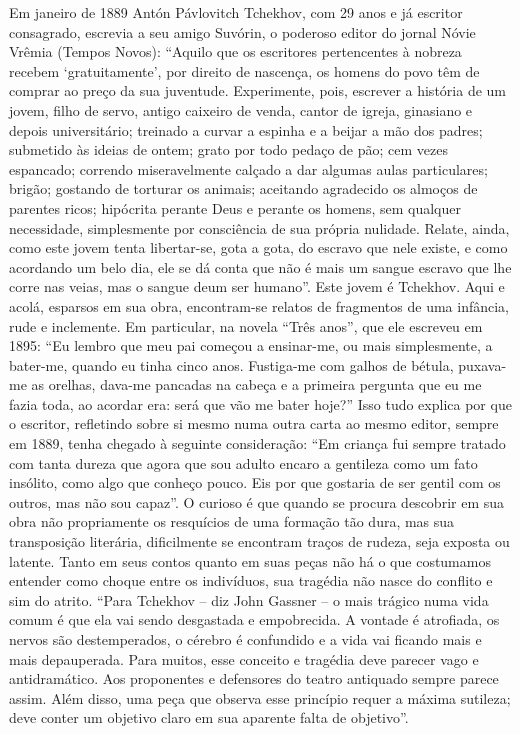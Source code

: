 Em janeiro de 1889 Antón Pávlovitch Tchekhov, com 29 anos e já escritor
consagrado, escrevia a seu amigo Suvórin, o poderoso editor do jornal
Nóvie Vrêmia (Tempos Novos): ``Aquilo que os escritores pertencentes à
nobreza recebem `gratuitamente', por direito de nascença, os homens do
povo têm de comprar ao preço da sua juventude. Experimente, pois,
escrever a história de um jovem, filho de servo, antigo caixeiro de
venda, cantor de igreja, ginasiano e depois universitário; treinado a
curvar a espinha e a beijar a mão dos padres; submetido às ideias de
ontem; grato por todo pedaço de pão; cem vezes espancado; correndo
miseravelmente calçado a dar algumas aulas particulares; brigão;
gostando de torturar os animais; aceitando agradecido os almoços de
parentes ricos; hipócrita perante Deus e perante os homens, sem qualquer
necessidade, simplesmente por consciência de sua própria nulidade.
Relate, ainda, como este jovem tenta libertar-se, gota a gota, do
escravo que nele existe, e como acordando um belo dia, ele se dá conta
que não é mais um sangue escravo que lhe corre nas veias, mas o sangue
deum ser humano''. Este jovem é Tchekhov. Aqui e acolá, esparsos em sua
obra, encontram-se relatos de fragmentos de uma infância, rude e
inclemente. Em particular, na novela ``Três anos'', que ele escreveu em
1895: ``Eu lembro que meu pai começou a ensinar-me, ou mais
simplesmente, a bater-me, quando eu tinha cinco anos. Fustiga-me com
galhos de bétula, puxava-me as orelhas, dava-me pancadas na cabeça e a
primeira pergunta que eu me fazia toda, ao acordar era: será que vão me
bater hoje?'' Isso tudo explica por que o escritor, refletindo sobre si
mesmo numa outra carta ao mesmo editor, sempre em 1889, tenha chegado à
seguinte consideração: ``Em criança fui sempre tratado com tanta dureza
que agora que sou adulto encaro a gentileza como um fato insólito, como
algo que conheço pouco. Eis por que gostaria de ser gentil com os
outros, mas não sou capaz''. O curioso é que quando se procura descobrir
em sua obra não propriamente os resquícios de uma formação tão dura, mas
sua transposição literária, dificilmente se encontram traços de rudeza,
seja exposta ou latente. Tanto em seus contos quanto em suas peças não
há o que costumamos entender como choque entre os indivíduos, sua
tragédia não nasce do conflito e sim do atrito. ``Para Tchekhov -- diz
John Gassner -- o mais trágico numa vida comum é que ela vai sendo
desgastada e empobrecida. A vontade é atrofiada, os nervos são
destemperados, o cérebro é confundido e a vida vai ficando mais e mais
depauperada. Para muitos, esse conceito e tragédia deve parecer vago e
antidramático. Aos proponentes e defensores do teatro antiquado sempre
parece assim. Além disso, uma peça que observa esse princípio requer a
máxima sutileza; deve conter um objetivo claro em sua aparente falta de
objetivo''.

